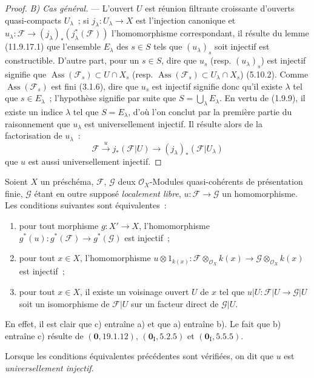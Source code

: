 \begin{proof}
\emph{B) Cas général.} --- L'ouvert $U$ est réunion filtrante croissante
d'ouverts quasi-compacts $U_\lambda$~; si $j_\lambda:U_\lambda\to X$ est
l'injection canonique et
$u_\lambda:\mathcal F\to(j_\lambda)_*(j_\lambda^*(\mathcal F))$
l'homomorphisme correspondant, il résulte du lemme (11.9.17.1) que l'ensemble
$E_\lambda$ des $s\in S$ tels que $(u_\lambda)_s$ soit injectif est
constructible. D'autre part, pour un $s\in S$, dire que $u_s$ (resp.
$(u_\lambda)_s$) est injectif signifie que
$\operatorname{Ass}(\mathcal F_s)\subset U\cap X_s$ (resp.
$\operatorname{Ass}(\mathcal F_s)\subset U_\lambda\cap X_s$) (5.10.2).
Comme $\operatorname{Ass}(\mathcal F_s)$ est fini (3.1.6), dire que $u_s$ est
injectif signifie donc qu'il existe $\lambda$ tel que $s\in E_\lambda$~;
l'hypothèse signifie par suite que $S=\bigcup_\lambda E_\lambda$. En vertu de
(1.9.9), il existe un indice $\lambda$ tel que $S=E_\lambda$, d'où l'on
conclut par la première partie du raisonnement que $u_\lambda$ est
universellement injectif. Il résulte alors de la factorisation de $u_\lambda$~:
\[
\mathcal F\xrightarrow{u}j_*(\mathcal F|U)\longrightarrow
(j_\lambda)_*(\mathcal F|U_\lambda)
\]
que $u$ est aussi universellement injectif.
\end{proof}

\begin{remark}[11.9.18]
\label{IV.11.9.18-fr}
Soient $X$ un préschéma, $\mathcal F$, $\mathcal G$ deux
$\mathcal O_X$-Modules quasi-cohérents de présentation finie, $\mathcal G$
étant en outre supposé \emph{localement libre},
$u:\mathcal F\to\mathcal G$ un homomorphisme. Les conditions suivantes sont
équivalentes~:
\begin{enumerate}[label=\emph{\alph*)}]
  \item pour tout morphisme $g:X'\to X$, l'homomorphisme
  $g^*(u):g^*(\mathcal F)\to g^*(\mathcal G)$ est injectif~;
  \item pour tout $x\in X$, l'homomorphisme
  $u\otimes 1_{k(x)}:\mathcal F\otimes_{\mathcal O_X}k(x)
  \to\mathcal G\otimes_{\mathcal O_X}k(x)$ est injectif~;
  \item pour tout $x\in X$, il existe un voisinage ouvert $U$ de $x$ tel que
  $u|U:\mathcal F|U\to\mathcal G|U$ soit un isomorphisme de $\mathcal F|U$
  sur un facteur direct de $\mathcal G|U$.
\end{enumerate}

En effet, il est clair que c) entraîne a) et que a) entraîne b). Le fait que
b) entraîne c) résulte de $(\mathbf 0,19.1.12)$,
$(\mathbf 0_{\mathrm I},5.2.5)$ et $(\mathbf 0_{\mathrm I},5.5.5)$.

Lorsque les conditions équivalentes précédentes sont vérifiées, on dit que
$u$ est \emph{universellement injectif}.
\end{remark}

